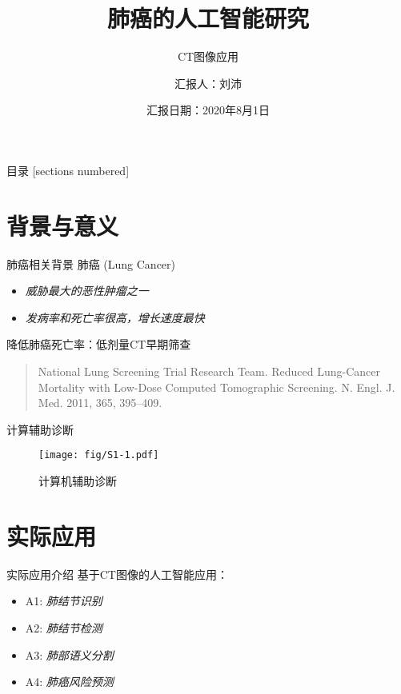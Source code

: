 \documentclass[10pt]{beamer}
\title{肺癌的人工智能研究}
\subtitle{CT图像应用}
\date{汇报日期：2020年8月1日}
\author{汇报人：刘沛}
\institute{四川大学华西医院}
\begin{document}
\maketitle

\begin{frame}{目录}
  [sections numbered]
  \tableofcontents[hideallsubsections]
\end{frame}

\section{背景与意义}

\begin{frame}{肺癌相关背景}
  肺癌 (Lung Cancer)
  \begin{itemize}
    \item \textit{威胁最大的恶性肿瘤之一}
    \item \textit{发病率和死亡率很高，增长速度最快}
  \end{itemize}

  降低肺癌死亡率：低剂量CT早期筛查\\
  \vbox{}
  \begin{quote}
    National Lung Screening Trial Research Team. Reduced Lung-Cancer Mortality with Low-Dose Computed Tomographic Screening. N. Engl. J. Med. 2011, 365, 395–409.
  \end{quote}
  
\end{frame}

\begin{frame}{计算辅助诊断}
  \begin{figure}[H]
    \centering
    \texttt{[image: fig/S1-1.pdf]}
    \caption{计算机辅助诊断}
  \end{figure}
\end{frame}

\section{实际应用}

\begin{frame}{实际应用介绍}
  基于CT图像的人工智能应用：
  \begin{itemize}
    \item A1: \textit{肺结节识别}
    \item A2: \textit{肺结节检测}
    \item A3: \textit{肺部语义分割}
    \item A4: \textit{肺癌风险预测}
  \end{itemize}
\end{frame}
\end{document}
